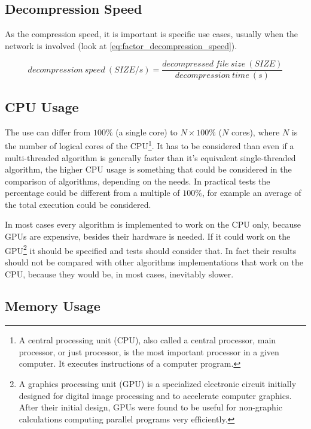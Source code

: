 \documentclass[12pt, a4paper]{report}
\begin{document}
\subsection{Decompression Speed}

As the compression speed, it is important is specific use cases, usually when the network is involved (look at
\autoref{eq:factor_decompression_speed}).

\begin{equation} \label{eq:factor_decompression_speed}
  decompression\ speed\ (SIZE / s) = \frac{decompressed\ file\ size\ (SIZE)}{decompression\ time\ (s)}
\end{equation}

\subsection{CPU Usage}

The use can differ from \(100 \%\) (a single core) to \(N \times 100 \%\) (\(N\) cores), where \(N\) is the number of logical
cores of the CPU\footnote{A central processing unit (CPU), also called a central processor, main processor, or just processor, is
the most important processor in a given computer. It executes instructions of a computer program.}.
It has to be considered than even if a multi-threaded algorithm is generally faster than it's equivalent single-threaded
algorithm, the higher CPU usage is something that could be considered in the comparison of algorithms, depending on the needs.
In practical tests the percentage could be different from a multiple of \(100 \%\), for example an average of the total execution
could be considered.

In most cases every algorithm is implemented to work on the CPU only, because GPUs are expensive, besides their hardware is
needed.
If it could work on the GPU\footnote{A graphics processing unit (GPU) is a specialized electronic circuit initially designed for
digital image processing and to accelerate computer graphics. After their initial design, GPUs were found to be useful for
non-graphic calculations computing parallel programs very efficiently.} it should be specified and tests should consider that.
In fact their results should not be compared with other algorithms implementations that work on the CPU, because they would be,
in most cases, inevitably slower.

\subsection{Memory Usage}
\end{document}
